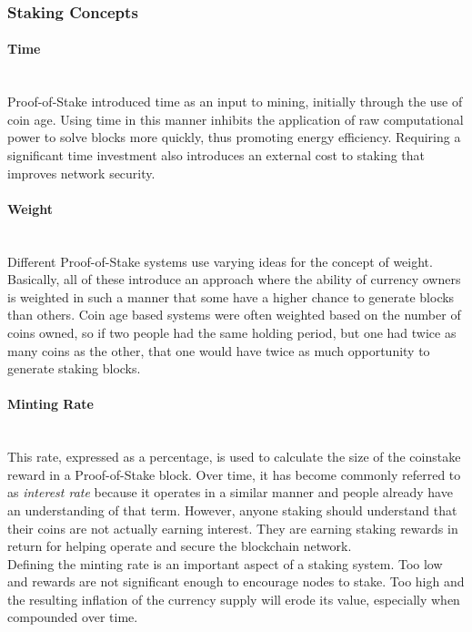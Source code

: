 \documentclass[11pt]{article}
\begin{document}
\subsubsection{Staking Concepts}

\paragraph{Time} ~\\
Proof-of-Stake introduced time as an input to mining, initially through the use of coin age. Using time in this manner inhibits the application of raw computational power to solve blocks more quickly, thus promoting energy efficiency. Requiring a significant time investment also introduces an external cost to staking that improves network security. 

\paragraph{Weight} ~\\
Different Proof-of-Stake systems use varying ideas for the concept of weight. Basically, all of these introduce an approach where the ability of currency owners is weighted in such a manner that some have a higher chance to generate blocks than others. Coin age based systems were often weighted based on the number of coins owned, so if two people had the same holding period, but one had twice as many coins as the other, that one would have twice as much opportunity to generate staking blocks.

\paragraph{Minting Rate} ~\\
This rate, expressed as a percentage, is used to calculate the size of the coinstake reward in a Proof-of-Stake block. Over time, it has become commonly referred to as \textit{interest rate} because it operates in a similar manner and people already have an understanding of that term. However, anyone staking should understand that their coins are not actually earning interest. They are earning staking rewards in return for helping operate and secure the blockchain network.\\

\noindent Defining the minting rate is an important aspect of a staking system. Too low and rewards are not significant enough to encourage nodes to stake. Too high and the resulting inflation of the currency supply will erode its value, especially when compounded over time.
\end{document}
